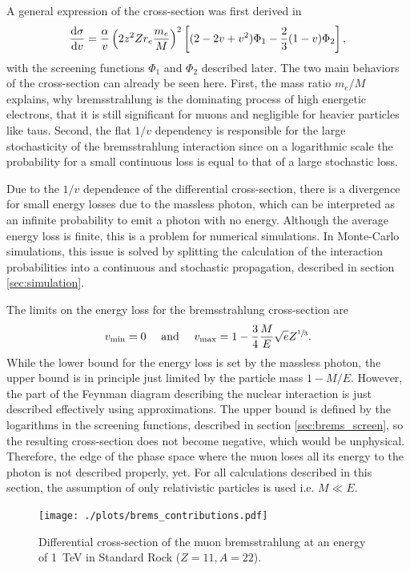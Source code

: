 A general expression of the cross-section was first derived in \cite{Bethe34}
\begin{align} \label{eq:brems}
\frac{\mathrm{d} \sigma}{\mathrm{d} v} =
    \frac{\alpha}{v} \left(2z^2Z r_e \frac{m_e}{M}\right)^2
    \left[ (2 - 2v + v^2) \Phi_1 - \frac{2}{3} (1 - v) \Phi_2 \right],
\end{align}
with the screening functions $\Phi_1$ and $\Phi_2$ described later.
The two main behaviors of the cross-section can already be seen here.
First, the mass ratio $m_e / M$ explains, why bremsstrahlung is the dominating process of high energetic electrons, that it is still significant for muons and negligible for heavier particles like taus.
Second, the flat $1/v$ dependency is responsible for the large stochasticity of the bremsstrahlung interaction since on a logarithmic scale the probability for a small continuous loss is equal to that of a large stochastic loss.

Due to the $1/v$ dependence of the differential cross-section, there is a divergence for small energy losses due to the massless photon, which can be interpreted as an infinite probability to emit a photon with no energy.
Although the average energy loss is finite, this is a problem for numerical simulations.
In Monte-Carlo simulations, this issue is solved by splitting the calculation of the interaction probabilities into a continuous and stochastic propagation, described in section \ref{sec:simulation}.

The limits on the energy loss for the bremsstrahlung cross-section are
\begin{align}
    v_{\text{min}} = 0
    \quad
    \text{ and }
    \quad
    v_{\text{max}} = 1 - \frac{3}{4}\frac{M}{E}\sqrt{e}Z^{\sfrac13}.
\end{align}
While the lower bound for the energy loss is set by the massless photon, the upper bound is in principle just limited by the particle mass $1-M/E$.
However, the part of the Feynman diagram describing the nuclear interaction is just described effectively using approximations.
The upper bound is defined by the logarithms in the screening functions, described in section \ref{sec:brems_screen}, so the resulting cross-section does not become negative, which would be unphysical.
Therefore, the edge of the phase space where the muon loses all its energy to the photon is not described properly, yet.
For all calculations described in this section, the assumption of only relativistic particles is used i.e. $M \ll E$.
\begin{figure}[H]
    \centering
    \texttt{[image: ./plots/brems\_contributions.pdf]}
    \caption{Differential cross-section of the muon bremsstrahlung at an energy of \SI{1}{TeV} in Standard Rock ($Z=11, A=22$).}
    \label{fig:brems_dsigma}
\end{figure}

